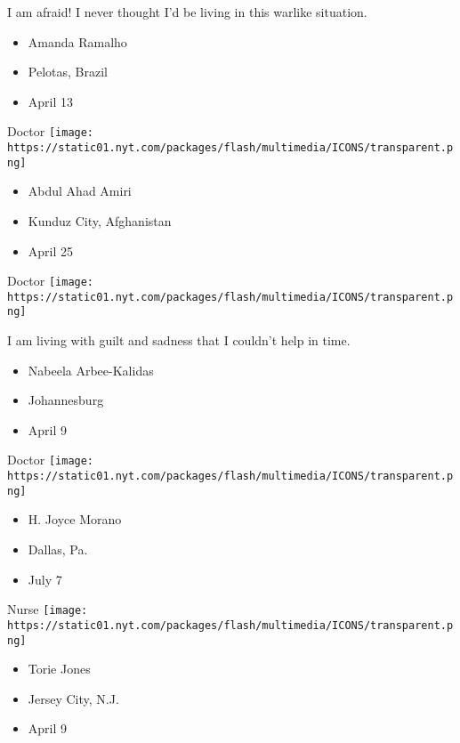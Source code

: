I am afraid! I never thought I'd be living in this warlike situation.

\begin{itemize}
\tightlist
\item
  Amanda Ramalho
\item
  Pelotas, Brazil
\item
  April 13
\end{itemize}

\protect\hyperlink{item-abdul-ahad-amiri}{}

Doctor
\texttt{[image: https://static01.nyt.com/packages/flash/multimedia/ICONS/transparent.png]}

\begin{itemize}
\tightlist
\item
  Abdul Ahad Amiri
\item
  Kunduz City, Afghanistan
\item
  April 25
\end{itemize}

\protect\hyperlink{item-nabeela-arbee-kalidas}{}

Doctor
\texttt{[image: https://static01.nyt.com/packages/flash/multimedia/ICONS/transparent.png]}

I am living with guilt and sadness that I couldn't help in time.

\begin{itemize}
\tightlist
\item
  Nabeela Arbee-Kalidas
\item
  Johannesburg
\item
  April 9
\end{itemize}

\protect\hyperlink{item-h-joyce-morano}{}

Doctor
\texttt{[image: https://static01.nyt.com/packages/flash/multimedia/ICONS/transparent.png]}

\begin{itemize}
\tightlist
\item
  H. Joyce Morano
\item
  Dallas, Pa.
\item
  July 7
\end{itemize}

\protect\hyperlink{item-torie-jones}{}

Nurse
\texttt{[image: https://static01.nyt.com/packages/flash/multimedia/ICONS/transparent.png]}

\begin{itemize}
\tightlist
\item
  Torie Jones
\item
  Jersey City, N.J.
\item
  April 9
\end{itemize}


